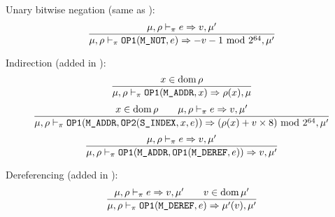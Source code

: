 Unary bitwise negation (same as \Cmm):
\[\dfrac{\mu,\rho\vdash_\pi e\Rightarrow v,\mu'}{\mu,\rho\vdash_\pi \texttt{OP1}(\texttt{M\_NOT}, e) \Rightarrow -v-1 \text{ mod } 2^{64},\mu'}\]

Indirection (added in \Cpm):
\[\dfrac{x\in\operatorname{dom}\rho}{\mu,\rho\vdash_\pi \texttt{OP1}(\texttt{M\_ADDR}, x)\Rightarrow \rho(x),\mu}\]
\[\dfrac{x\in\operatorname{dom}\rho \qquad \mu,\rho\vdash_\pi e\Rightarrow v,\mu'}{\mu,\rho\vdash_\pi \texttt{OP1}(\texttt{M\_ADDR}, \texttt{OP2}(\texttt{S\_INDEX}, x, e)) \Rightarrow (\rho(x)+v\times 8) \text{ mod } 2^{64}, \mu'}\]
\[\dfrac{\mu,\rho\vdash_\pi e\Rightarrow v,\mu'}{\mu,\rho\vdash_\pi \texttt{OP1}(\texttt{M\_ADDR}, \texttt{OP1}(\texttt{M\_DEREF}, e)) \Rightarrow v,\mu'}\]

Dereferencing (added in \Cpm):
\[\dfrac{\mu,\rho\vdash_\pi e\Rightarrow v,\mu' \qquad v\in\operatorname{dom}\mu'}{\mu,\rho\vdash_\pi \texttt{OP1}(\texttt{M\_DEREF}, e) \Rightarrow \mu'(v),\mu'}\]



